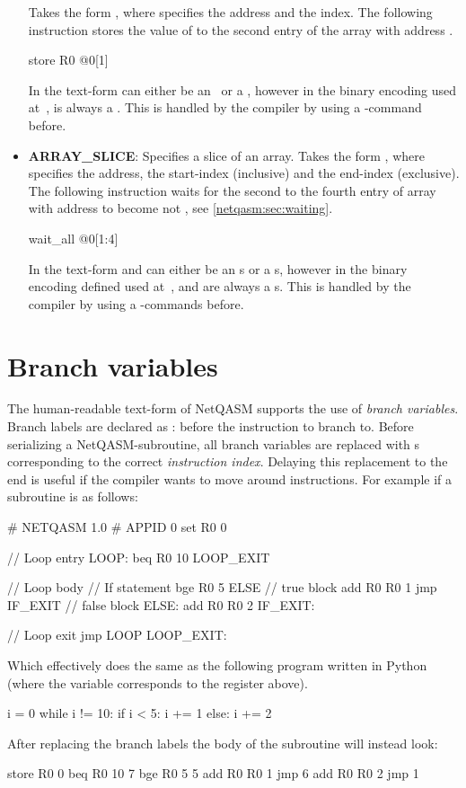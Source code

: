 \begin{itemize}
        Takes the form , where  specifies the address and  the index.
        The following instruction stores the value of  to the second entry of the array with address .
        \begin{nqcode}
store R0 @0[1]\end{nqcode}
        In the text-form  can either be an \IMMEDIATE\ or a \REGISTER, however in the binary encoding used at~\cite{git_netqasm},  is always a \REGISTER.
        This is handled by the compiler by using a -command before.
  \item \textbf{ARRAY\_SLICE}: Specifies a slice of an array.
        Takes the form , where  specifies the address,  the start-index (inclusive) and  the end-index (exclusive).
        The following instruction waits for the second to the fourth entry of array with address  to become not , see \cref{netqasm:sec:waiting}.
        \begin{nqcode}
wait_all @0[1:4]\end{nqcode}
        In the text-form  and  can either be an \IMMEDIATE{}s or a \REGISTER{}s, however in the binary encoding defined used at~\cite{git_netqasm},  and  are always a \REGISTER{}s.
        This is handled by the compiler by using a -commands before.
\end{itemize}

\section{Branch variables}
\label{netqasm:sec:branch_variables}
The human-readable text-form of \ac{NetQASM} supports the use of \emph{branch variables}.
Branch labels are declared as : before the instruction to branch to.
Before serializing a \ac{NetQASM}-subroutine, all branch variables are replaced with \IMMEDIATE{}s corresponding to the correct \emph{instruction index}.
Delaying this replacement to the end is useful if the compiler wants to move around instructions.
For example if a subroutine is as follows:
\begin{nqcode}
# NETQASM 1.0
# APPID 0
set R0 0

// Loop entry
LOOP:
beq R0 10 LOOP_EXIT

// Loop body
// If statement
bge R0 5 ELSE
// true block
add R0 R0 1
jmp IF_EXIT
// false block
ELSE:
add R0 R0 2
IF_EXIT:

// Loop exit
jmp LOOP
LOOP_EXIT:\end{nqcode}
Which effectively does the same as the following program written in Python (where the variable  corresponds to the register  above).
\begin{pycode}
i = 0
while i != 10:
  if i < 5:
    i += 1
  else:
    i += 2
\end{pycode}
After replacing the branch labels the body of the subroutine will instead look:
\begin{nqcode}
store R0 0
beq R0 10 7
bge R0 5 5
add R0 R0 1
jmp 6
add R0 R0 2
jmp 1\end{nqcode}

